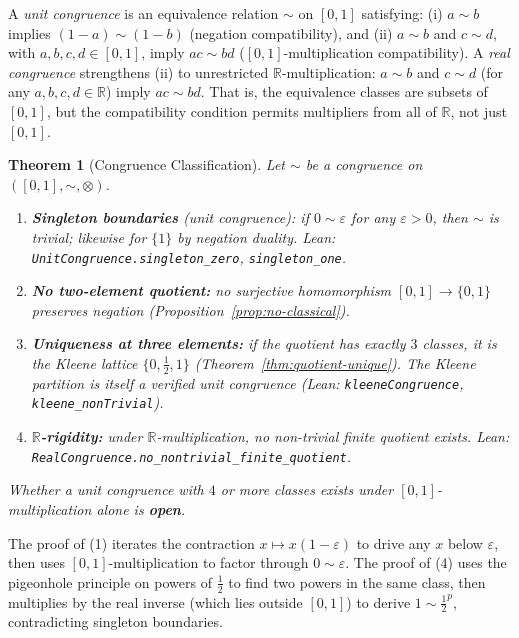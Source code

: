\documentclass[11pt,a4paper]{article}
\newtheorem{theorem}{Theorem}[section]
\newcommand{\negc}{\mathord{\sim}}
\newcommand{\conjc}{\otimes}
\newcommand{\Real}{\mathbb{R}}
\begin{document}
A \emph{unit congruence} is an equivalence relation $\sim$ on
$[0,1]$ satisfying: (i) $a \sim b$ implies $(1-a) \sim (1-b)$
(negation compatibility), and (ii) $a \sim b$ and $c \sim d$, with
$a,b,c,d \in [0,1]$, imply $ac \sim bd$ ($[0,1]$-multiplication
compatibility).
A \emph{real congruence} strengthens (ii) to unrestricted
$\Real$-multiplication: $a \sim b$ and $c \sim d$ (for any
$a,b,c,d \in \Real$) imply $ac \sim bd$.
That is, the equivalence classes are subsets of $[0,1]$, but the
compatibility condition permits multipliers from all of $\Real$,
not just $[0,1]$.

\begin{theorem}[Congruence Classification]
\label{thm:congruence}
Let $\sim$ be a congruence on $([0,1], \negc, \conjc)$.
\begin{enumerate}[label=\textup{(\arabic*)}]
\item \textbf{Singleton boundaries} (unit congruence):
  if $0 \sim \varepsilon$ for any $\varepsilon > 0$, then $\sim$
  is trivial; likewise for $\{1\}$ by negation duality.
  Lean: \texttt{UnitCongruence\allowbreak.singleton\_zero},
  \texttt{singleton\allowbreak\_one}.
\item \textbf{No two-element quotient:}
  no surjective homomorphism $[0,1] \to \{0,1\}$ preserves
  negation (Proposition~\ref{prop:no-classical}).
\item \textbf{Uniqueness at three elements:}
  if the quotient has exactly $3$ classes, it is the Kleene lattice
  $\{0, \tfrac{1}{2}, 1\}$
  (Theorem~\ref{thm:quotient-unique}).
  The Kleene partition is itself a verified unit congruence
  (Lean: \texttt{kleeneCongruence},
  \texttt{kleene\_nonTrivial}).
\item \textbf{$\Real$-rigidity:}
  under $\Real$-multiplication, no non-trivial finite quotient
  exists.
  Lean:\\
  \texttt{RealCongruence.no\_nontrivial\_finite\_quotient}.
\end{enumerate}
Whether a unit congruence with $4$ or more classes exists under
$[0,1]$-multiplication alone is \textbf{open}.
\end{theorem}

The proof of (1) iterates the contraction $x \mapsto x(1-\varepsilon)$
to drive any $x$ below $\varepsilon$, then uses
$[0,1]$-multiplication to factor through $0 \sim \varepsilon$.
The proof of (4) uses the pigeonhole principle on powers of
$\tfrac{1}{2}$ to find two powers in the same class, then multiplies
by the real inverse (which lies outside $[0,1]$) to derive
$1 \sim \tfrac{1}{2}^p$, contradicting singleton boundaries.
\end{document}
